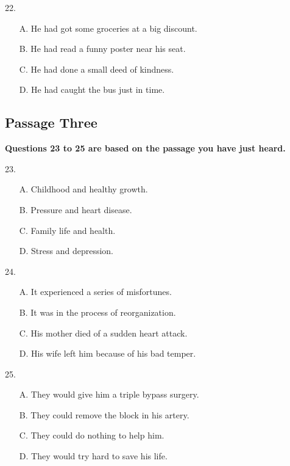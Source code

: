 \documentclass[UTF8,11pt]{ctexart}
\begin{document}
22.


\begin{itemize}[leftmargin=2em,itemsep=.2em,topsep=.4em]\item[A.] He had got some groceries at a big discount.
\item[B.] He had read a funny poster near his seat.
\item[C.] He had done a small deed of kindness.
\item[D.] He had caught the bus just in time.
\end{itemize}

\subsection*{\textbf{Passage Three}}


\textbf{Questions 23 to 25 are based on the passage you have just heard.}


23.


\begin{itemize}[leftmargin=2em,itemsep=.2em,topsep=.4em]\item[A.] Childhood and healthy growth.
\item[B.] Pressure and heart disease.
\item[C.] Family life and health.
\item[D.] Stress and depression.
\end{itemize}

24.


\begin{itemize}[leftmargin=2em,itemsep=.2em,topsep=.4em]\item[A.] It experienced a series of misfortunes.
\item[B.] It was in the process of reorganization.
\item[C.] His mother died of a sudden heart attack.
\item[D.] His wife left him because of his bad temper.
\end{itemize}

25.


\begin{itemize}[leftmargin=2em,itemsep=.2em,topsep=.4em]\item[A.] They would give him a triple bypass surgery.
\item[B.] They could remove the block in his artery.
\item[C.] They could do nothing to help him.
\item[D.] They would try hard to save his life.
\end{itemize}
\end{document}
